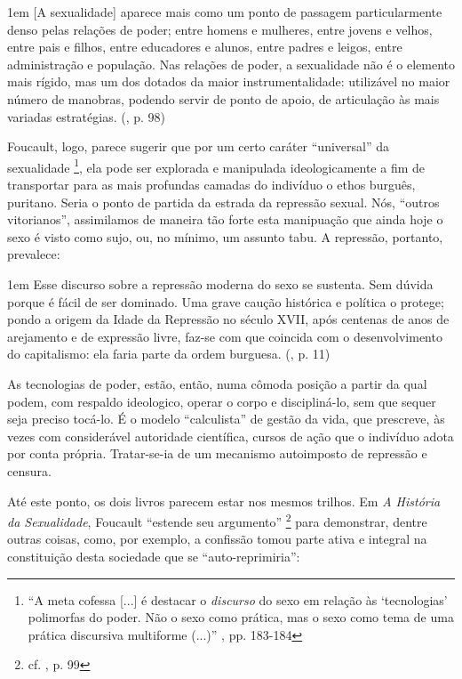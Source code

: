 \documentclass[12pt,a4paper]{article}
\newenvironment{citac}
{
	\begin{addmargin}
		[4cm]{1em} \footnotesize}{\normalfont 
	\end{addmargin}
}
\begin{document}
	\begin{citac}
		[A sexualidade] aparece mais como um ponto de passagem particularmente 
		denso pelas relações de poder; entre homens e mulheres, entre jovens e 
		velhos, entre pais e filhos, entre educadores e alunos, entre padres e 
		leigos, entre administração e população. Nas relações de poder, a 
		sexualidade não é o elemento mais rígido, mas um dos dotados da maior 
		instrumentalidade: utilizável no maior número de manobras, podendo 
		servir de ponto de apoio, de articulação às mais variadas estratégias. 
		(\cite{hs}, p. 98)
	\end{citac}
	
	Foucault, logo, parece sugerir que por um certo caráter ``universal'' da 
	sexualidade
	\footnote{``A meta cofessa [...] é destacar o \textit{discurso} do sexo 
	em relação às `tecnologias' polimorfas do poder. Não o sexo como prática, 
	mas o sexo como tema de uma prática discursiva multiforme (...)'' 
	\cite{merquior}, pp. 183-184}, 
	ela pode ser explorada e manipulada ideologicamente a fim de 
	transportar para as mais profundas camadas do indivíduo o ethos burguês, 
	puritano. Seria o ponto de partida da estrada da repressão sexual. Nós, 
	``outros vitorianos'', assimilamos de maneira tão forte esta manipuação 
	que ainda hoje o sexo é visto como sujo, ou, no mínimo, um assunto tabu. 
	A repressão, portanto, prevalece: 
	
	\begin{citac}
		Esse discurso sobre a repressão moderna do sexo se sustenta. Sem 
		dúvida porque é fácil de ser dominado. Uma grave caução histórica e 
		política o protege; pondo a origem da Idade da Repressão no século 
		XVII, após centenas de anos de arejamento e de expressão livre, 
		faz-se com que coincida com o desenvolvimento do capitalismo: ela 
		faria parte da ordem burguesa. 
		(\cite{hs}, p. 11)
	\end{citac}
	
	As tecnologias de poder, estão, então, numa cômoda posição a partir da 
	qual podem, com respaldo ideologico, operar o corpo e discipliná-lo, 
	sem que sequer seja preciso tocá-lo. É o modelo ``calculista'' de gestão 
	da vida, que prescreve, às vezes com considerável autoridade científica, 
	cursos de ação que o indivíduo adota por conta própria. Tratar-se-ia de 
	um mecanismo autoimposto de repressão e censura. 
	
	Até este ponto, os dois livros parecem estar nos mesmos trilhos. Em 
	\textit{A História da Sexualidade}, Foucault ``estende seu argumento''
		\footnote{cf. \cite{pwkn}, p. 99}
	para demonstrar, dentre outras coisas, como, por exemplo, a confissão 
	tomou parte ativa e integral na constituição desta sociedade que se 
	``auto-reprimiria'': 
	
\end{document}
